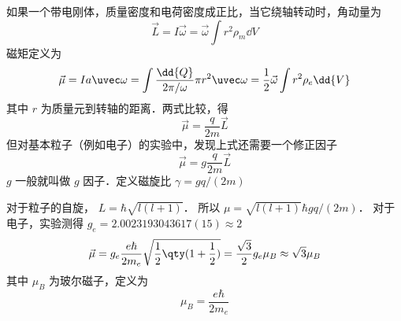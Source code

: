 
如果一个带电刚体，质量密度和电荷密度成正比，当它绕轴转动时，角动量为
\begin{equation}
\vec L = I\vec \omega  = \vec \omega \int r^2 \rho _m \dd{V}
\end{equation}
磁矩定义为
\begin{equation}
\vec \mu  = Ia \uvec\omega = \int \frac{\dd{Q}}{2\pi/\omega}  \pi r^2 \uvec \omega
= \frac 12 \vec \omega \int r^2\rho _e \dd{V} 
\end{equation}
其中 $r$ 为质量元到转轴的距离．两式比较，得
\begin{equation}
\vec \mu  = \frac{q}{2m} \vec L
\end{equation}
但对基本粒子（例如电子）的实验中，发现上式还需要一个修正因子
\begin{equation}
\vec \mu  = g\frac{q}{2m}\vec L
\end{equation}
$g$ 一般就叫做 $g$ 因子．定义磁旋比 $\gamma  = gq/(2m)$

对于粒子的自旋， $L = \hbar \sqrt{l(l + 1)} $． 所以 $\mu = \sqrt{l (l + 1)} \hbar gq/(2m)$． 
对于电子，实验测得 $g_e = 2.0023193043617(15) \approx 2$ 
\begin{equation}
\vec \mu  = g_e \frac{e\hbar}{2 m_e} \sqrt{\frac12 \qty(1 + \frac 12)}  = \frac{\sqrt 3}{2} g_e \mu_B \approx \sqrt 3 \mu _B
\end{equation}
其中 $\mu _B$ 为玻尔磁子，定义为
\begin{equation}
\mu _B = \frac{e\hbar}{2 m_e}
\end{equation}

